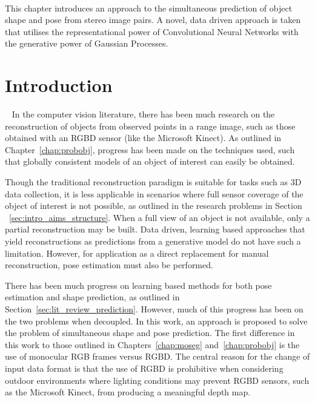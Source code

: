 ~\label{chap:spp}
\begin{chapterabstract}
This chapter introduces an approach to the simultaneous prediction of object shape 
and pose from stereo image pairs. A novel, data driven approach is taken that utilises 
the representational power of Convolutional Neural Networks with the generative power of 
Gaussian Processes.
\end{chapterabstract}

\section{Introduction}
~\label{sec:spp_introduction}
In the computer vision literature, there has been much research on the reconstruction of objects
from observed points in a range image, such as those obtained with an RGBD sensor (like 
the Microsoft Kinect). As outlined in Chapter~\ref{chap:probobj}, progress has been made 
on the techniques used, such that globally consistent models of an object of interest can 
easily be obtained.

Though the traditional reconstruction paradigm is suitable for tasks such as 3D data 
collection, it is less applicable in scenarios where full sensor coverage of the object 
of interest is not possible, as outlined in the research problems in Section
~\ref{sec:intro_aims_structure}. When a full view of an object is not available, only a 
partial reconstruction may be built. Data driven, learning based approaches that yield 
reconstructions as predictions from a generative model do not have such a limitation. 
However, for application as a direct replacement for manual reconstruction, pose estimation 
must also be performed.

There has been much progress on learning based methods for both pose estimation and 
shape prediction, as outlined in Section~\ref{sec:lit_review_prediction}. However, much of 
this progress has been on the two problems when decoupled. In this work, an approach is 
proposed to solve the problem of simultaneous shape and pose prediction. The first 
difference in this work to those outlined in Chapters~\ref{chap:moseg} and~\ref{chap:probobj} 
is the use of monocular RGB frames versus RGBD\@. The central reason for the change of input data 
format is that the use of RGBD is prohibitive when considering outdoor environments where lighting 
conditions may prevent RGBD sensors, such as the Microsoft Kinect, from producing a meaningful depth map.

